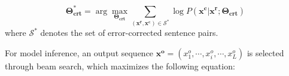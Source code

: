 \documentclass{article} %
\begin{document}
\begin{equation}
\boldsymbol{\Theta^*_{crt}} = \arg \max_{\boldsymbol{\Theta_{crt}}} \sum_{(\boldsymbol{x^r},\boldsymbol{x^c}) \in \mathcal{S}^*} \log P(\boldsymbol{x^c}|\boldsymbol{x^r};\boldsymbol{\Theta_{crt}})
\end{equation}
where $\mathcal{S}^*$ denotes the set of error-corrected sentence pairs.



For model inference, an output sequence $\boldsymbol{x^o}=(x^o_1,\cdots,x^o_i,\cdots,x^o_L)$ is selected through beam search, which maximizes the following equation:

%
%
%



%
%
%
%
%
%
%
\end{document}
